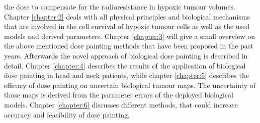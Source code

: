the dose to compensate for the radioresistance in hypoxic tumour volumes. Chapter \ref{chapter:2} deals with all physical principles and biological mechanisms that are involved in the cell survival of hypoxic tumour cells as well as the used models and derived parameters. Chapter \ref{chapter:3} will give a small overview on the above mentioned dose painting methods that have been proposed in the past years. Afterwards the novel approach of biological dose painting is described in detail. Chapter \ref{chapter:4} describes the results of the application of biological dose painting in head and neck patients, while chapter \ref{chapter:5} describes the efficacy of dose painting on uncertain biological tumour maps. The uncertainty of those maps is derived from the parameter errors of the deployed biological models. Chapter \ref{chapter:6} discusses different methods, that could increase accuracy and feasibility of dose painting.